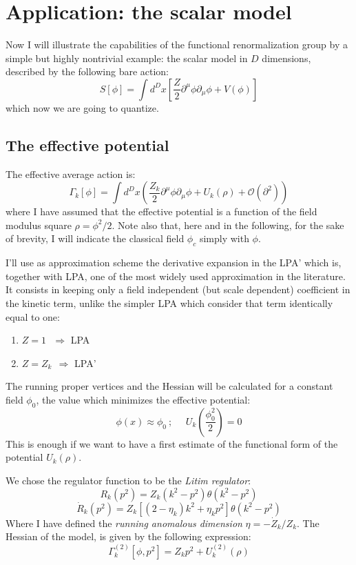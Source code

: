 \section{Application: the scalar model}
Now I will illustrate the capabilities of the functional renormalization group by a simple but highly 
nontrivial example: the scalar model in $D$ dimensions, described by the following bare action:
\begin{equation}
 S[\phi] = \int d^Dx\left[\frac{Z}{2}\partial^\mu\phi\partial_\mu\phi + V(\phi)\right]
\end{equation}
which now we are going to quantize.
\subsection{The effective potential}
The effective average action is: 
\begin{equation}
 \Gamma_k[\phi] = \int d^D x \left(\frac{Z_k}{2}\partial^\mu \phi \partial_\mu \phi + U_k(\rho) + \mathcal{O}(\partial^2)\right)
\end{equation}
where I have assumed that the effective potential is a function of the field modulus square $\rho = \phi^2/2$. 
Note also that, here and in the following, for the sake of brevity, I will indicate the classical field $\phi_c$ simply with $\phi$. 

I'll use as approximation scheme the derivative expansion in the  LPA' which is, together with LPA, one of the most widely used approximation in the literature.
It consists in keeping only a field independent (but scale dependent) coefficient in the kinetic term, unlike the simpler LPA which consider that term identically equal to one:
\begin{enumerate}
 \item $Z = 1\ \ \ \Longrightarrow$ LPA
 \item $Z = Z_k\ \  \Longrightarrow$ LPA'
\end{enumerate}
The running proper vertices and the Hessian will be calculated for a constant field $\phi_0$, the value which minimizes the effective potential:
\begin{equation}
 \phi(x) \approx \phi_0\ ;\ \ \ \ \ \ U_k\left(\frac{\phi_0^2}{2}\right) = 0
\end{equation}
This is enough if we want to have a first estimate of the functional form of the potential $U_k(\rho)$.

We chose the regulator function to be the \emph{Litim regulator}:
\begin{equation}\label{erre}
 R_k(p^2) = Z_k(k^2 - p^2)\theta(k^2 - p^2)
\end{equation}
\begin{equation}\label{errepunto}
 \dot{R}_k(p^2) = Z_k[(2 - \eta_k)k^2 + \eta_k p^2]\theta(k^2 - p^2)
\end{equation}
Where I have defined the \emph{running anomalous dimension} $\eta = -\dot{Z}_k/Z_k$.
The Hessian of the model, is given by the following expression:
\begin{equation}
 \Gamma_k^{(2)} [\phi, p^2] = Z_k p^2 + U_k^{(2)} (\rho)
\end{equation}

